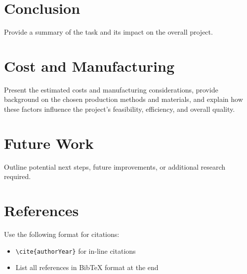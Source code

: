 \documentclass[a4paper,12pt]{article}
\begin{document}
\section{Conclusion}
\label{sec:Conclusion}
Provide a summary of the task and its impact on the overall project.

\section{Cost and Manufacturing}
\label{sec:Cost and Manufacturing}
Present the estimated costs and manufacturing considerations, provide background on the chosen production methods and materials, and explain how these factors influence the project’s feasibility, efficiency, and overall quality.

\section{Future Work}
\label{sec:Future Work}
Outline potential next steps, future improvements, or additional research required.

\section{References}
\label{sec:references}
Use the following format for citations:
\begin{itemize}
    \item \texttt{\textbackslash cite\{authorYear\}} for in-line citations
    \item List all references in BibTeX format at the end
\end{itemize}

%
%
\end{document}
